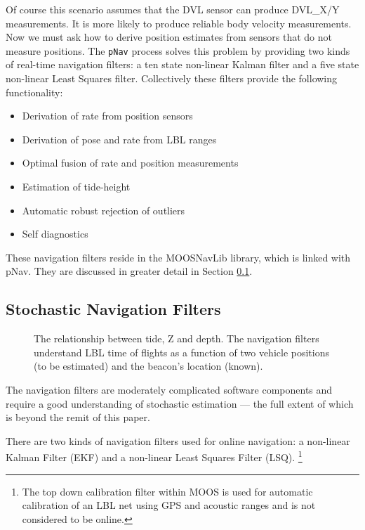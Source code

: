 \documentclass[a4paper,10pt]{article}
\newcommand{\Code}[1]{\texttt{#1} }
\newcommand{\code}[1]{\Code{#1} }
\begin{document}
Of course this scenario assumes that the DVL sensor can produce
DVL\_X/Y measurements. It is more likely to produce reliable body
velocity measurements. Now we must ask how to derive
position estimates from sensors that do not measure positions. The
\code{pNav} process solves this problem by providing two kinds of real-time navigation filters: a ten state non-linear Kalman filter and
a five state non-linear Least Squares filter. Collectively these
filters provide the following functionality:
\begin{itemize}
\item Derivation of rate from position sensors
\item Derivation of pose and rate from LBL ranges
\item Optimal fusion of rate and position measurements
\item Estimation of tide-height
\item Automatic robust rejection of outliers
\item Self diagnostics
\end{itemize}
These navigation filters reside in the MOOSNavLib library, which is
linked with pNav. They are discussed in greater detail in Section
\ref{sec:NavFilters}.

\subsection{Stochastic Navigation Filters}\label{sec:NavFilters}

\begin{figure}
\centering {}
\caption{The relationship between tide, Z and depth. The navigation
filters understand  LBL time of flights as a function of two
vehicle positions (to be estimated) and the beacon's location
(known).}
\end{figure}

The navigation filters are moderately complicated software
components and require a good understanding of stochastic
estimation --- the full extent of which is beyond the remit of this
paper.

There are two kinds of navigation filters used for online
navigation: a non-linear Kalman Filter (EKF) and a non-linear Least
Squares Filter (LSQ). \footnote{The top down calibration filter within MOOS is
used for automatic calibration of an LBL net using GPS and
acoustic ranges and is not considered to be online. }
\end{document}
